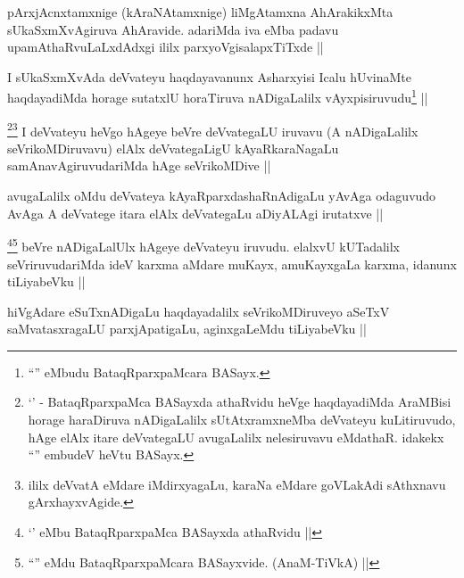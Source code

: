 
\begin{artha}
pArxjAcnxtamxnige (kAraNAtamxnige) liMgAtamxna AhArakikxMta sUkaSxmXvAgiruva AhAravide. adariMda iva eMba padavu upamAthaRvuLaLxdAdxgi ililx parxyoVgisalapxTiTxde ||
\end{artha}


\begin{artha}
I sUkaSxmXvAda deVvateyu haqdayavanunx Asharxyisi Icalu hUvinaMte haqdayadiMda horage sutatxlU horaTiruva nADigaLalilx vAyxpisiruvudu\footnote{``\stext'' eMbudu BataqRparxpaMcara BASayx.} ||
\end{artha}

\begin{artha}
\footnote{`\stext' - BataqRparxpaMca BASayxda athaRvidu heVge haqdayadiMda AraMBisi horage haraDiruva nADigaLalilx sUtAtxramxneMba deVvateyu kuLitiruvudo, hAge elAlx itare deVvategaLU avugaLalilx nelesiruvavu eMdathaR. idakekx ``\stext'' embudeV heVtu BASayx.}\footnote{ililx deVvatA eMdare iMdirxyagaLu, karaNa eMdare goVLakAdi sAthxnavu gArxhayxvAgide.} I deVvateyu heVgo hAgeye beVre deVvategaLU iruvavu (A nADigaLalilx seVrikoMDiruvavu) elAlx deVvategaLigU kAyaRkaraNagaLu samAnavAgiruvudariMda hAge seVrikoMDive ||
\end{artha}

\begin{artha}
avugaLalilx oMdu deVvateya kAyaRparxdashaRnAdigaLu yAvAga odaguvudo AvAga A deVvatege itara elAlx deVvategaLu aDiyALAgi irutatxve ||
\end{artha}

\begin{artha}
\footnote{`\stext' eMbu BataqRparxpaMca BASayxda athaRvidu ||}\footnote{``\stext'' eMdu BataqRparxpaMcara BASayxvide. (AnaM-TiVkA) ||} beVre nADigaLalUlx hAgeye deVvateyu iruvudu. elalxvU kUTadalilx seVriruvudariMda ideV karxma aMdare muKayx, amuKayxgaLa karxma, idanunx tiLiyabeVku ||
\end{artha}


\begin{artha}
hiVgAdare eSuTxnADigaLu haqdayadalilx seVrikoMDiruveyo aSeTxV saMvatasxragaLU parxjApatigaLu, aginxgaLeMdu tiLiyabeVku ||
\end{artha}

